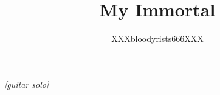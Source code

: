 \documentclass[2020/08/28 v2]{fanfic_book}
\title{My Immortal}
\author{XXXbloodyrists666XXX}
\date{\DTMusedate{date}}
\begin{document}
\maketitle
\frontmatter
\tableofcontents


% 
\cleardoublepage\chapter*{}
\renewcommand{\epigraphflush}{center}\epigraph{\centering\emph{[guitar solo]}}{\centering{}\\\citeauthor{MCR-black_parade-dead}}
\mainmatter
\begingroup\let\clearpage\bigskip












































\endgroup
\end{document}
